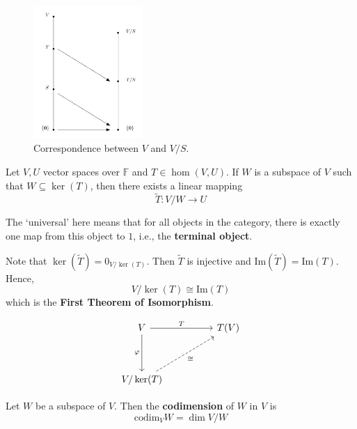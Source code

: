 \begin{figure}[h]
	\centering
	  \includegraphics[width=0.37\textwidth]{Figures/correspondence_theorem.png} 
	  \caption{Correspondence between $V$ and $V/S$.}
	  \label{fig:correspondence-theorem}
\end{figure}

\begin{theorem}
	Let $V, U$ vector spaces over $\mathbb{F}$ and $T \in \hom(V, U)$. If $W$ is a subspace of $V$ such that $W \subseteq \ker (T)$, then there exists a linear mapping 
	\[
		\tilde{T} : V / W \longrightarrow U
	\]
\end{theorem}

The `universal' here means that for all objects in the category, there is exactly one map from this object to $\mathfrak{1}$, i.e., the \textbf{terminal object}.

Note that $\ker (\tilde{T}) = 0_{V/\ker (T)}$. Then $\tilde{T}$ is injective and $\text{Im}(\tilde{T}) = \text{Im}(T)$. Hence,
\[
	V/\ker (T) \cong \text{Im}(T)
\]
which is the \textbf{First Theorem of Isomorphism}.

\[\begin{tikzcd}
	V && {T(V)} \\
	\\
	{V/\ker(T)}
	\arrow["T", from=1-1, to=1-3]
	\arrow["\varphi"', from=1-1, to=3-1]
	\arrow["\cong"', dashed, from=3-1, to=1-3]
\end{tikzcd}\]

\begin{definition}[Codimension]
	Let $W$ be a subspace of $V$. Then the \textbf{codimension} of $W$ in $V$ is
	\[
		\text{codim}_V W = \dim V/W
	\]
\end{definition}

